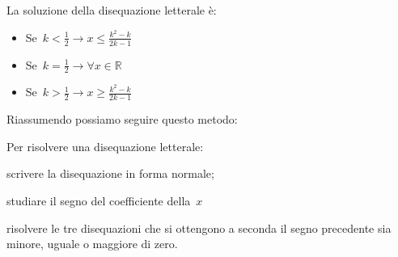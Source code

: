 La soluzione della disequazione letterale è:

\begin{multicols}{3}
\begin{itemize} [noitemsep]
 \item Se~$k < \frac{1}{2} \rightarrow x \le \frac{k^2 - k}{2 k - 1}$
 \item Se~$k = \frac{1}{2} \rightarrow \forall x \in \mathbb{R}$
 \item Se~$k > \frac{1}{2} \rightarrow x \ge \frac{k^2 - k}{2 k - 1}$
\end{itemize}
\end{multicols}

Riassumendo possiamo seguire questo metodo:

\begin{procedura}
 Per risolvere una disequazione letterale:
\begin{enumeratea}
 \item scrivere la disequazione in forma normale;
 \item studiare il segno del coefficiente della~$x$
 \item risolvere le tre disequazioni che si ottengono a seconda il segno 
  precedente sia minore, uguale o maggiore di zero.
\end{enumeratea}
\end{procedura}






